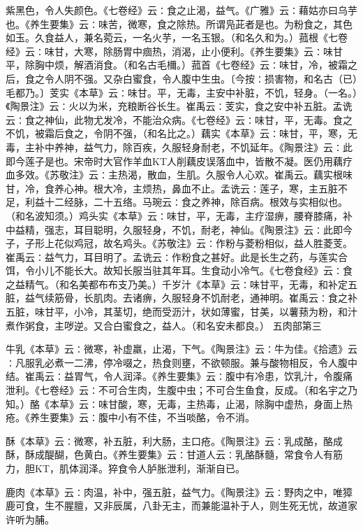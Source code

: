 \documentclass[a4paper,12pt,UTF8,twoside]{ctexbook}
\begin{document}
紫黑色，令人失颜色。《七卷经》云∶食之止渴，益气。《广雅》云∶藉姑亦曰乌芋也。《养生要集》云∶味苦，微寒，食之除热。所谓凫茈者是也。为粉食之，其色如玉。久食益人，兼名菀云，一名火芋，一名玉银。（和名久和为。）菰根《七卷经》云∶味甘，大寒，除肠胃中痼热，消渴，止小便利。《养生要集》云∶味甘平，除胸中烦，解酒消食。（和名古毛檷。）菰首《七卷经》云∶味甘，冷，被霜之后，食之令人阴不强。又杂白蜜食，令人腹中生虫。〔今按∶损害物，和名古（已）毛都乃。〕芰实《本草》云∶味甘。平，无毒，主安中补脏，不饥，轻身。（一名。）《陶景注》云∶火以为米，充粮断谷长生。崔禹云∶芰实，食之安中补五脏。孟诜云∶食之神仙，此物尤发冷，不能治众病。《七卷经》云∶味甘，平，无毒。食之不饥，被霜后食之，令阴不强，（和名比之。）藕实《本草》云∶味甘，平，寒，无毒，主补中养神，益气力，除百疾，久服轻身耐老，不饥延年。《陶景注》云∶此即今莲子是也。宋帝时大官作羊血KT人削藕皮误落血中，皆散不凝。医仍用藕疗血多效。《苏敬注》云∶主热渴，散血，生肌。久服令人心欢。崔禹云。藕实根味甘，冷，食养心神。根大冷，主烦热，鼻血不止。孟诜云∶莲子，寒，主五脏不足，利益十二经脉，二十五络。马琬云∶食之养神，除百病。根效与实相似也。（和名波知须。）鸡头实《本草》云∶味甘，平，无毒，主疗湿痹，腰脊膝痛，补中益精，强志，耳目聪明，久服轻身，不饥，耐老，神仙。《陶景注》云∶此即今子，子形上花似鸡冠，故名鸡头。《苏敬注》云∶作粉与菱粉相似，益人胜菱芰。崔禹云∶益气力，耳目明了。孟诜云∶作粉食之甚好。此是长生之药，与莲实合饵，令小儿不能长大。故知长服当驻其年耳。生食动小冷气。《七卷食经》云∶食之益精气。（和名美都布布支乃美。）千岁汁《本草》云∶味甘平，无毒，和补定五脏，益气续筋骨，长肌肉。去诸痹，久服轻身不饥耐老，通神明。崔禹云∶食之补五脏，味甘平，小冷，其茎切，绝而受沥汁，状如薄蜜，甘美，以薯蓣为粉，和汁煮作粥食，主哕逆。又合白蜜食之，益人。（和名安未都良。）
五肉部第三

牛乳《本草》云∶微寒，补虚羸，止渴，下气。《陶景注》云∶牛为佳。《拾遗》云∶凡服乳必煮一二沸，停冷啜之，热食则壅，不欲顿服。兼与酸物相反，令人腹中结。崔禹云∶益胃气，令人润泽。《养生要集》云∶腹中有冷患，饮乳汁，令腹痛泄利。《七卷经》云∶不可合生肉，生腹中虫；不可合生鱼食，反成。（和名宇之乃知。）酪《本草》云∶味甘酸，寒，无毒，主热毒，止渴，除胸中虚热，身面上热疮。《养生要集》云∶腹中小有不佳，不当啖酪，令不消。

酥《本草》云∶微寒，补五脏，利大肠，主口疮。《陶景注》云∶乳成酪，酪成酥，酥成醍醐，色黄白。《养生要集》云∶甘道人云∶乳酪酥髓，常食令人有筋力，胆KT，肌体润泽。猝食令人胪胀泄利，渐渐自已。

鹿肉《本草》云∶肉温，补中，强五脏，益气力。《陶景注》云∶野肉之中，唯獐鹿可食，生不腥膻，又非辰属，八卦无主，而兼能温补于人，则生死无忧，故道家许听为脯。
\end{document}
